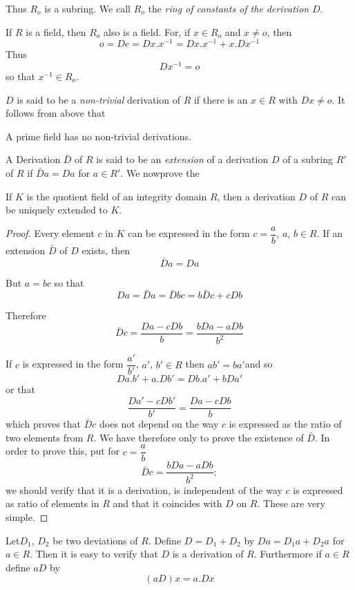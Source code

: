 Thus $R_o$ is a subring. We call $R_o$ the \textit{ring of constants
  of the derivation} $D$. 

If $R$ is a field, then $R_o$ also is a field. For, if $x \in R_o$ and
$x \neq o$, then 
$$
o=De=Dx.x^{-1}=Dx.x^{-1}+x.Dx^{-1}
$$
Thus
$$
Dx^{-1}=o
$$
so that $x^{-1}\in R_o$.

$D$ is said to be a \textit{non-trivial} derivation of $R$ if there is
an $x \in R$ with $Dx \neq o$. It follows from above that 

\begin{thm}\label{c3:thm3}%
A prime field has no non-trivial derivations.
\end{thm}

A Derivation $\bar{D}$ of $R$ is said to be an \textit{extension} of a
derivation $D$ of a subring $R'$ of $R$ if $\bar{D}a=Da$ for $a \in R'$. We
now\pageoriginale prove the   

\begin{thm}\label{c3:thm4}%
 If $K$ is the quotient field of an integrity domain $R$, then a
 derivation $D$ of $R$ can be uniquely extended to $K$. 
\end{thm}

\begin{proof}
Every element $c$ in $K$ can be expressed in the form
$c=\dfrac{a}{b}$, $a$, $b \in R$. If an extension $\bar{D}$ of $D$ exists,
then 
$$
\bar{D}a =Da
$$

But $a=bc$ so that
$$
Da=\bar{D}a=\bar{D}bc=b\bar{D}c+c Db
$$

Therefore
$$
\bar{D}c=\frac{Da-c Db}{b}=\frac{b Da-a Db}{b^2}
$$

If $c$ is expressed in the form $\dfrac{a'}{b'}$, $a'$, $b' \in R$ then
$ab'=ba'$and so 
$$
Da.b'+a.Db'=Db.a'+b Da'
$$
or that
$$
\frac{Da'-c Db'}{b'}= \frac{Da-c Db}{b}
$$
which proves that $\bar{D}c$ does not depend on the way $c$ is expressed as
the ratio of two elements from $R$. We have therefore only to prove
the existence of $\bar{D}$. In order to prove this, put for $c=\dfrac{a}{b}$ 
$$
\bar{D}c =\frac{b Da-a Db}{b^2};
$$
we should verify that it is a derivation, is independent of the way
$c$ is expressed as ratio of elements in $R$ and that it coincides
with $D$ on $R$. These are very simple. 
\end{proof}

Let\pageoriginale $D_1$, $D_2$ be two deviations of $R$. Define
$D=D_1+D_2$ by $Da=D_1 a+D_2 a$ for $a \in R$. Then it is easy to
verify that $D$ is a derivation of $R$. Furthermore if $a \in R$
define $aD$ by   
$$
(aD)x =a.Dx
$$

